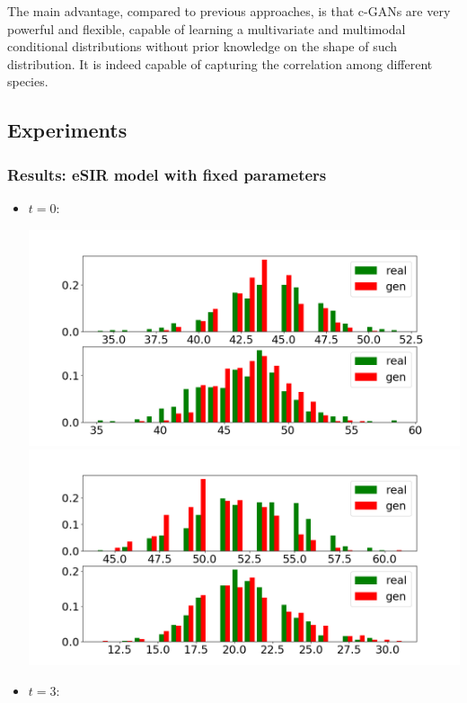 \documentclass{article}
\begin{document}
The main advantage, compared to previous approaches, is that c-GANs are very powerful and flexible, capable of learning a multivariate and multimodal conditional distributions without prior knowledge on the shape of such distribution. It is indeed capable of capturing the correlation among different species.

\subsection{Experiments}

\subsubsection{Results: eSIR model with fixed parameters}

\begin{itemize}
    \item $t = 0$:
    \begin{center}
        \includegraphics[scale = 0.18]{new_img/eSIR_orig_dataset_hist_comparison_[ 0.04 -0.08]_t_0.png}
        \includegraphics[scale=0.18]{new_img/eSIR_orig_dataset_hist_comparison_[ 0.12 -0.64]_t_0.png}
    \end{center}
    \item $t = 3$:

\end{itemize}
\end{document}
